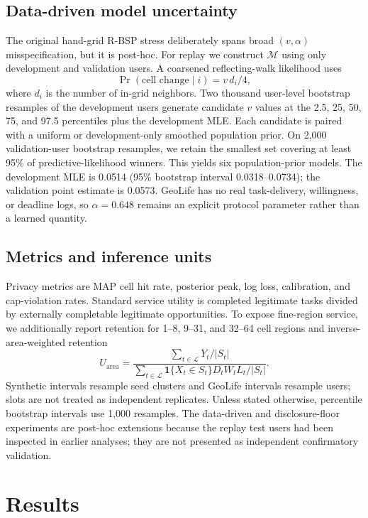 \documentclass[review,11pt,times]{elsarticle}
\newcommand{\ind}{\mathbf{1}}
\begin{document}
\subsection{Data-driven model uncertainty}
The original hand-grid R-BSP stress deliberately spans broad \((v,\alpha)\) misspecification, but it is post-hoc. For replay we construct \(\mathcal M\) using only development and validation users. A coarsened reflecting-walk likelihood uses
\[
 \Pr(\text{cell change}\mid i)=v\,d_i/4,
\]
where \(d_i\) is the number of in-grid neighbors. Two thousand user-level bootstrap resamples of the development users generate candidate \(v\) values at the 2.5, 25, 50, 75, and 97.5 percentiles plus the development MLE. Each candidate is paired with a uniform or development-only smoothed population prior. On 2,000 validation-user bootstrap resamples, we retain the smallest set covering at least 95\% of predictive-likelihood winners. This yields six population-prior models. The development MLE is 0.0514 (95\% bootstrap interval 0.0318--0.0734); the validation point estimate is 0.0573. GeoLife has no real task-delivery, willingness, or deadline logs, so \(\alpha=0.648\) remains an explicit protocol parameter rather than a learned quantity.

\subsection{Metrics and inference units}
Privacy metrics are MAP cell hit rate, posterior peak, log loss, calibration, and cap-violation rates. Standard service utility is completed legitimate tasks divided by externally completable legitimate opportunities. To expose fine-region service, we additionally report retention for 1--8, 9--31, and 32--64 cell regions and inverse-area-weighted retention
\begin{equation}
 U_{\mathrm{area}}=
 \frac{\sum_{t\in\mathcal L}Y_t/|S_t|}
 {\sum_{t\in\mathcal L}\ind\{X_t\in S_t\}D_tW_tL_t/|S_t|}.
 \label{eq:weighted-utility}
\end{equation}
Synthetic intervals resample seed clusters and GeoLife intervals resample users; slots are not treated as independent replicates. Unless stated otherwise, percentile bootstrap intervals use 1,000 resamples. The data-driven and disclosure-floor experiments are post-hoc extensions because the replay test users had been inspected in earlier analyses; they are not presented as independent confirmatory validation.

\section{Results}
\label{sec:results}
\end{document}
